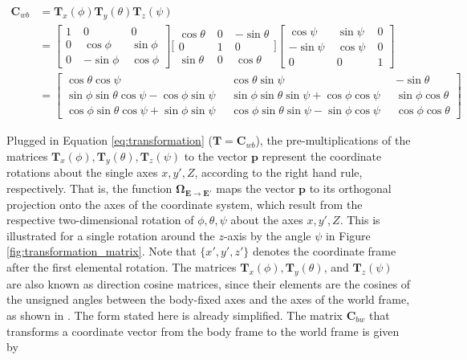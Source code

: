 \begin{equation}\label{eq:transformation_matrices}
\begin{split}
\mathbf{C}_{wb} & = \mathbf{T}_x(\phi) \mathbf{T}_y(\theta) \mathbf{T}_z(\psi) \\
 & = {\left[ \begin{smallmatrix}
    1 \; & 0 \; & 0 \\
    0 \; & \cos \phi \; & \sin \phi \\
    0 \; & -\sin \phi \; & \cos \phi
    \end{smallmatrix}\right]}
    {\bigg[ \begin{smallmatrix}
    \cos \theta \; & 0 \; & -\sin \theta \\
    0 \; & 1 \; & 0 \\
    \sin \theta \; & 0 \; & \cos \theta
    \end{smallmatrix} \bigg]}
    {\left[\begin{smallmatrix}
    \cos \psi \; & \sin \psi \; & 0 \\
    -\sin \psi \; & \cos \psi \; & 0 \\
    0 \; & 0 \; & 1
    \end{smallmatrix}\right]}\\
 & = {\left[\begin{smallmatrix}
   \cos \theta \cos \psi \; &
    \cos \theta \sin \psi \; &
   -\sin \theta \\
    \sin \phi \sin \theta \cos \psi - \cos \phi \sin \psi \;\; &
    \sin \phi \sin \theta \sin \psi + \cos \phi \cos \psi \;\; &
    \sin \phi \cos \theta \\
    \cos \phi \sin \theta \cos \psi + \sin \phi \sin \psi \;\; &
    \cos \phi \sin \theta \sin \psi - \sin \phi \cos \psi \;\; &
    \cos \phi \cos \theta
  \end{smallmatrix}\right]}
\end{split}
\end{equation}

\noindent
Plugged in Equation \ref{eq:transformation} ($\mathbf{T} = \mathbf{C}_{wb}$), the pre-multiplications of the matrices $\mathbf{T}_x(\phi), \mathbf{T}_y(\theta), \mathbf{T}_z(\psi)$ to the vector $\mathbf{p}$ represent the coordinate rotations about the single axes $x, y', Z$, according to the right hand rule, respectively. That is, the function $\bm{\Omega}_{\mathbf{E} \rightarrow \mathbf{E}'}$ maps the vector $\mathbf{p}$ to its orthogonal projection onto the axes of the coordinate system, which result from the respective two-dimensional rotation of $\phi, \theta, \psi$ about the axes $x, y', Z$. This is illustrated for a single rotation around the $z$-axis by the angle $\psi$ in Figure \ref{fig:transformation_matrix}. Note that $\{x', y', z'\}$ denotes the coordinate frame after the first elemental rotation. The matrices $\mathbf{T}_x(\phi), \mathbf{T}_y(\theta)$, and $\mathbf{T}_z(\psi)$ are also known as direction cosine matrices, since their elements are the cosines of the unsigned angles between the body-fixed axes and the axes of the world frame, as shown in \cite{diebel2006attitude}. The form stated here is already simplified. The matrix $\mathbf{C}_{bw}$ that transforms a coordinate vector from the body frame to the world frame is given by

